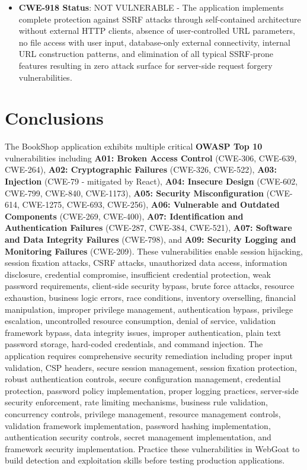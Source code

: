 \documentclass[]{UCD_CS_FYP_Report}
\begin{document}
\begin{itemize}
	\item \textbf{CWE-918 Status}: NOT VULNERABLE - The application implements complete protection against SSRF attacks through self-contained architecture without external HTTP clients, absence of user-controlled URL parameters, no file access with user input, database-only external connectivity, internal URL construction patterns, and elimination of all typical SSRF-prone features resulting in zero attack surface for server-side request forgery vulnerabilities.
\end{itemize}



\chapter{Conclusions}

The BookShop application exhibits multiple critical \textbf{OWASP Top 10} vulnerabilities including \textbf{A01: Broken Access Control} (CWE-306, CWE-639, CWE-264), \textbf{A02: Cryptographic Failures} (CWE-326, CWE-522), \textbf{A03: Injection} (CWE-79 - mitigated by React), \textbf{A04: Insecure Design} (CWE-602, CWE-799, CWE-840, CWE-1173), \textbf{A05: Security Misconfiguration} (CWE-614, CWE-1275, CWE-693, CWE-256), \textbf{A06: Vulnerable and Outdated Components} (CWE-269, CWE-400), \textbf{A07: Identification and Authentication Failures} (CWE-287, CWE-384, CWE-521), \textbf{A07: Software and Data Integrity Failures} (CWE-798), and \textbf{A09: Security Logging and Monitoring Failures} (CWE-209). These vulnerabilities enable session hijacking, session fixation attacks, CSRF attacks, unauthorized data access, information disclosure, credential compromise, insufficient credential protection, weak password requirements, client-side security bypass, brute force attacks, resource exhaustion, business logic errors, race conditions, inventory overselling, financial manipulation, improper privilege management, authentication bypass, privilege escalation, uncontrolled resource consumption, denial of service, validation framework bypass, data integrity issues, improper authentication, plain text password storage, hard-coded credentials, and command injection. The application requires comprehensive security remediation including proper input validation, CSP headers, secure session management, session fixation protection, robust authentication controls, secure configuration management, credential protection, password policy implementation, proper logging practices, server-side security enforcement, rate limiting mechanisms, business rule validation, concurrency controls, privilege management, resource management controls, validation framework implementation, password hashing implementation, authentication security controls, secret management implementation, and framework security implementation. Practice these vulnerabilities in WebGoat to build detection and exploitation skills before testing production applications.
\end{document}
